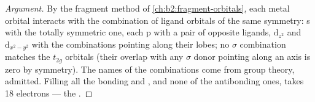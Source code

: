 \begin{proof}[Argument]
By the fragment method of \cref{ch:b2:fragment-orbitals}, each metal orbital interacts
with the combination of ligand orbitals of the same symmetry: s with the totally
symmetric one, each p with a pair of opposite ligands, $\mathrm d_{z^2}$ and $\mathrm
d_{x^2-y^2}$ with the combinations pointing along their lobes; no $\sigma$ combination
matches the $t_{2g}$ orbitals (their overlap with any $\sigma$ donor pointing along an axis
is zero by symmetry). The names of the combinations come from group theory, admitted.
Filling all the bonding and , and none of the antibonding ones, takes
18 electrons --- the .
\end{proof}

